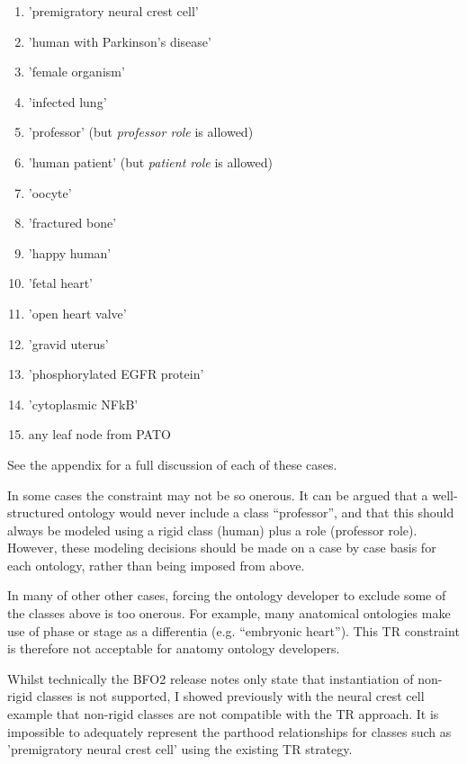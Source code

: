\documentclass{bioinfo}
\begin{document}
\begin{enumerate}

  \item 'premigratory neural crest cell'
  \item 'human with Parkinson's disease'
  \item 'female organism'
  \item 'infected lung'
  \item 'professor' (but \emph{professor role} is allowed)
  \item 'human patient' (but \emph{patient role} is allowed)
  \item 'oocyte'
  \item 'fractured bone'
  \item 'happy human'
  \item 'fetal heart'
  \item 'open heart valve'
  \item 'gravid uterus'
  \item 'phosphorylated EGFR protein'
  \item 'cytoplasmic NFkB'
  \item any leaf node from PATO

\end{enumerate}

See the appendix for a full discussion of each of these cases.

In some cases the constraint may not be so onerous. It can be argued
that a well-structured ontology would never include a class
``professor'', and that this should always be modeled using a rigid
class (human) plus a role (professor role). However, these modeling
decisions should be made on a case by case basis for each ontology,
rather than being imposed from above.

In many of other other cases, forcing the ontology developer to
exclude some of the classes above is too onerous. For example, many
anatomical ontologies make use of phase or stage as a differentia
(e.g. ``embryonic heart''). This TR constraint is therefore not
acceptable for anatomy ontology developers.

Whilst technically the BFO2 release notes only state that
instantiation of non-rigid classes is not supported, I showed
previously with the neural crest cell example that non-rigid classes
are not compatible with the TR approach. It is impossible to
adequately represent the parthood relationships for classes such as
'premigratory neural crest cell' using the existing TR strategy.
\end{document}
